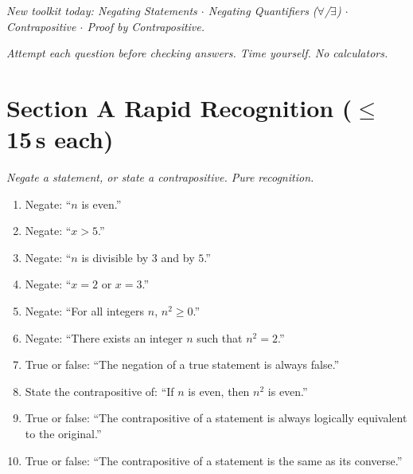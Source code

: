 \documentclass[11pt,a4paper]{article}
\begin{document}
\noindent\textit{New toolkit today: Negating Statements $\cdot$ Negating Quantifiers ($\forall$/$\exists$) $\cdot$ Contrapositive $\cdot$ Proof by Contrapositive.}

\vspace{2pt}
\noindent\textit{Attempt each question before checking answers. Time yourself. No calculators.}

\section*{Section A \quad Rapid Recognition \hfill{\normalfont\small($\leq$15\,s each)}}

\noindent\textit{Negate a statement, or state a contrapositive. Pure recognition.}

\begin{enumerate}

\item Negate: ``$n$ is even.''

\item Negate: ``$x>5$.''

\item Negate: ``$n$ is divisible by $3$ and by $5$.''

\item Negate: ``$x=2$ or $x=3$.''

\item Negate: ``For all integers $n$, $n^2 \geq 0$.''

\item Negate: ``There exists an integer $n$ such that $n^2=2$.''

\item True or false: ``The negation of a true statement is always false.''

\item State the contrapositive of: ``If $n$ is even, then $n^2$ is even.''

\item True or false: ``The contrapositive of a statement is always logically equivalent to the original.''

\item True or false: ``The contrapositive of a statement is the same as its converse.''

\end{enumerate}

\end{document}
